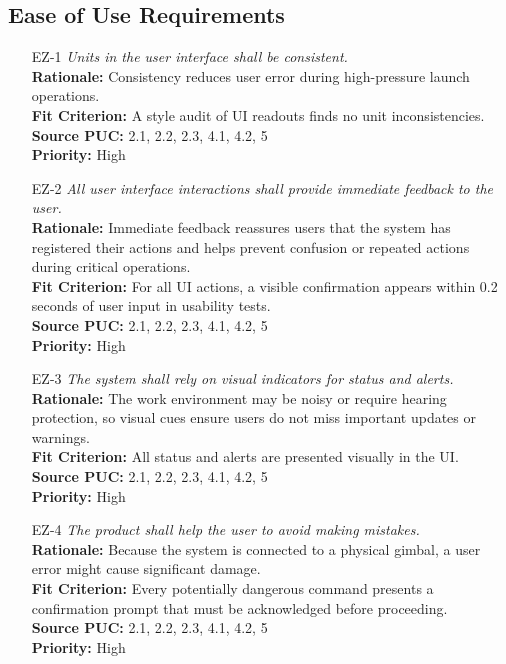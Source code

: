 \documentclass[12pt]{article}
\begin{document}
\subsection{Ease of Use Requirements}
\begin{itemize}[leftmargin=*]
  \item[EZ-1] \emph{Units in the user interface shall be consistent.}\\[2mm]
        \textbf{Rationale:} Consistency reduces user error during high-pressure launch operations.\\
        \textbf{Fit Criterion:} A style audit of UI readouts finds no unit inconsistencies.\\
        \textbf{Source PUC:} 2.1, 2.2, 2.3, 4.1, 4.2, 5 \\
        \textbf{Priority:} High

  \item[EZ-2] \emph{All user interface interactions shall provide immediate feedback to
          the user.}\\[2mm]
        \textbf{Rationale:} Immediate feedback reassures users that the system has registered their actions and helps prevent confusion or repeated actions during critical operations.\\
        \textbf{Fit Criterion:} For all UI actions, a visible confirmation appears within 0.2 seconds of user input in usability tests.\\
        \textbf{Source PUC:} 2.1, 2.2, 2.3, 4.1, 4.2, 5 \\
        \textbf{Priority:} High

  \item[EZ-3] \emph{The system shall rely on visual indicators for status and alerts.}\\[2mm]
        \textbf{Rationale:} The work environment may be noisy or require hearing protection, so visual cues ensure users do not miss important updates or warnings.\\
        \textbf{Fit Criterion:} All status and alerts are presented visually in the UI.\\
        \textbf{Source PUC:} 2.1, 2.2, 2.3, 4.1, 4.2, 5 \\
        \textbf{Priority:} High
  \item[EZ-4] \emph{The product shall help the user to avoid making mistakes.}\\[2mm]
        \textbf{Rationale:} Because the system is connected to a physical gimbal, a user error might cause significant damage.\\
        \textbf{Fit Criterion:} Every potentially dangerous command presents a confirmation prompt that must be acknowledged before proceeding.\\
        \textbf{Source PUC:} 2.1, 2.2, 2.3, 4.1, 4.2, 5 \\
        \textbf{Priority:} High
\end{itemize}
\end{document}
